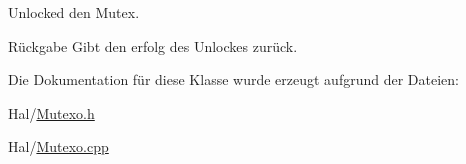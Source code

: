Unlocked den Mutex.

\begin{DoxyReturn}{Rückgabe}
Gibt den erfolg des Unlockes zurück. 
\end{DoxyReturn}


Die Dokumentation für diese Klasse wurde erzeugt aufgrund der Dateien\+:\begin{DoxyCompactItemize}
\item 
Hal/\hyperlink{_mutexo_8h}{Mutexo.\+h}\item 
Hal/\hyperlink{_mutexo_8cpp}{Mutexo.\+cpp}\end{DoxyCompactItemize}
